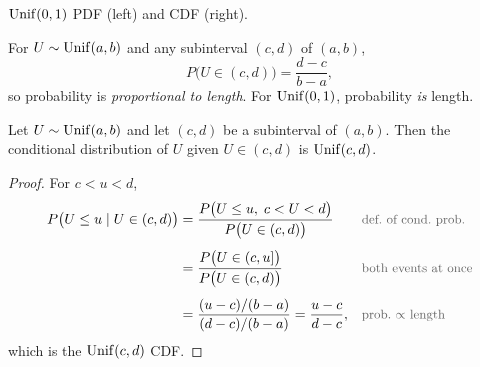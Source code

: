 \begin{center}

  {\small $\operatorname{Unif}(0,1)$ PDF (left) and CDF (right).}
\end{center}

\begin{remark}
  For $U \sim \operatorname{Unif}(a, b)$ and any subinterval $(c, d)$ of $(a, b)$,
  \[
    P\bigl(U \in (c, d)\bigr) = \frac{d - c}{b - a},
  \]
  so probability is \emph{proportional to length}. For $\operatorname{Unif}(0, 1)$, probability \emph{is} length.
\end{remark}

\begin{proposition}\label{prop:unifcond}
  Let $U \sim \operatorname{Unif}(a, b)$ and let $(c, d)$ be a subinterval of $(a, b)$. Then the conditional distribution of $U$ given $U \in (c, d)$ is $\operatorname{Unif}(c, d)$.
\end{proposition}

\begin{proof}
  For $c < u < d$,
  \begin{align*}
    P\bigl(U \le u \mid U \in (c, d)\bigr)
      &= \frac{P\bigl(U \le u,\; c < U < d\bigr)}{P\bigl(U \in (c, d)\bigr)}
      && \by{def.\ of cond.\ prob.} \\[0.4em]
      &= \frac{P\bigl(U \in (c, u]\bigr)}{P\bigl(U \in (c, d)\bigr)}
      && \by{both events at once} \\[0.4em]
      &= \frac{(u - c)/(b - a)}{(d - c)/(b - a)}
       = \frac{u - c}{d - c},
      && \by{prob.\ $\propto$ length}
  \end{align*}
  which is the $\operatorname{Unif}(c, d)$ CDF.
\end{proof}

